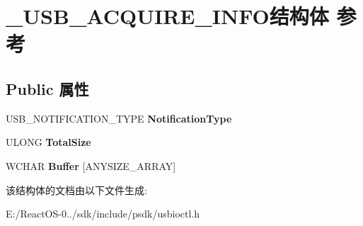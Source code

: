 \hypertarget{struct___u_s_b___a_c_q_u_i_r_e___i_n_f_o}{}\section{\+\_\+\+U\+S\+B\+\_\+\+A\+C\+Q\+U\+I\+R\+E\+\_\+\+I\+N\+F\+O结构体 参考}
\label{struct___u_s_b___a_c_q_u_i_r_e___i_n_f_o}
\subsection*{Public 属性}
\begin{DoxyCompactItemize}
\item 
\mbox{\label{struct___u_s_b___a_c_q_u_i_r_e___i_n_f_o_ab178209b87f8a6deaa7fc8344d98977f}} 
U\+S\+B\+\_\+\+N\+O\+T\+I\+F\+I\+C\+A\+T\+I\+O\+N\+\_\+\+T\+Y\+PE {\bfseries Notification\+Type}
\item 
\mbox{\label{struct___u_s_b___a_c_q_u_i_r_e___i_n_f_o_a519d5fd4175d5ed5047da63e0a235942}} 
U\+L\+O\+NG {\bfseries Total\+Size}
\item 
\mbox{\label{struct___u_s_b___a_c_q_u_i_r_e___i_n_f_o_adbbb62e44c2946a6e74e43426e5dc29d}} 
W\+C\+H\+AR {\bfseries Buffer} \mbox{[}A\+N\+Y\+S\+I\+Z\+E\+\_\+\+A\+R\+R\+AY\mbox{]}
\end{DoxyCompactItemize}


该结构体的文档由以下文件生成\+:\begin{DoxyCompactItemize}
\item 
E\+:/\+React\+O\+S-\/0../sdk/include/psdk/usbioctl.\+h\end{DoxyCompactItemize}
